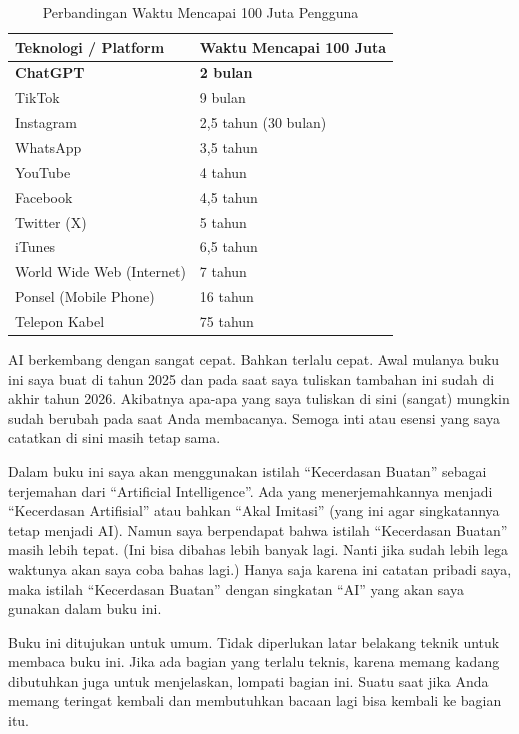 \begin{table}[h!]
\centering
\caption{Perbandingan Waktu Mencapai 100 Juta Pengguna}
    \label{tab:adopsitech}
\vspace{0.3cm}
\begin{tabular}{@{} l l @{}}
\toprule
\textbf{Teknologi / Platform} & \textbf{Waktu Mencapai 100 Juta} \\
\midrule
\textbf{ChatGPT} & \textbf{2 bulan} \\
TikTok & 9 bulan \\
Instagram & 2,5 tahun (30 bulan) \\
WhatsApp & 3,5 tahun \\
YouTube & 4 tahun \\
Facebook & 4,5 tahun \\
Twitter (X) & 5 tahun \\
iTunes & 6,5 tahun \\
World Wide Web (Internet) & 7 tahun \\
Ponsel (Mobile Phone) & 16 tahun \\
Telepon Kabel & 75 tahun \\
\bottomrule
\end{tabular}
\end{table}

AI berkembang dengan sangat cepat. Bahkan terlalu cepat.
Awal mulanya buku ini saya buat di tahun 2025 dan pada saat saya tuliskan
tambahan ini sudah di akhir tahun 2026.
Akibatnya apa-apa yang saya tuliskan di sini (sangat) mungkin sudah berubah
pada saat Anda membacanya.
Semoga inti atau esensi yang saya catatkan di sini masih tetap sama.


Dalam buku ini saya akan menggunakan istilah ``Kecerdasan Buatan''
sebagai terjemahan dari ``Artificial Intelligence''.
Ada yang menerjemahkannya menjadi ``Kecerdasan Artifisial''
atau bahkan ``Akal Imitasi'' (yang ini agar singkatannya tetap menjadi AI).
Namun saya berpendapat bahwa istilah ``Kecerdasan Buatan'' masih lebih tepat.
(Ini bisa dibahas lebih banyak lagi. Nanti jika sudah lebih lega waktunya
akan saya coba bahas lagi.)
Hanya saja karena ini catatan pribadi saya, maka istilah 
``Kecerdasan Buatan'' dengan singkatan ``AI'' yang
akan saya gunakan dalam buku ini.

Buku ini ditujukan untuk umum. Tidak diperlukan latar belakang teknik
untuk membaca buku ini. Jika ada bagian yang terlalu teknis, karena
memang kadang dibutuhkan juga untuk menjelaskan, lompati bagian ini.
Suatu saat jika Anda memang teringat kembali dan membutuhkan bacaan
lagi bisa kembali ke bagian itu.

